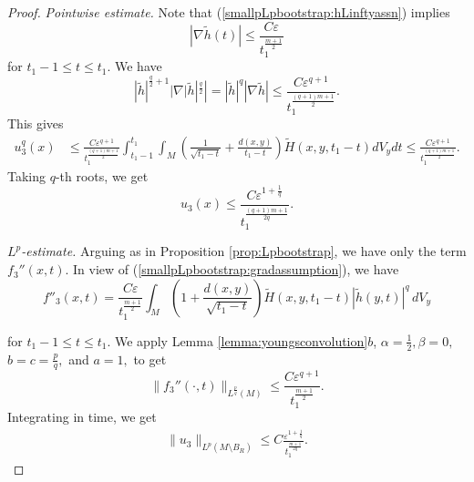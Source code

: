 \documentclass[12pt]{amsart}
\renewcommand{\1}{{\mathbf 1}}
\newcommand{\eps}{{\varepsilon}}
\theoremstyle{others}
\numberwithin{equation}{section}
\begin{document}
\begin{proof}
      \emph{Pointwise estimate.} Note that (\ref{smallpLpbootstrap:hLinftyassn}) implies
     \begin{equation}\label{smallpLpbootstrap:gradassumption}
     |\nabla \tilde{h}(t)| \leq \frac{C \eps}{t_1^{\frac{m + 1}{2}} }
     \end{equation}
    for $t_1 - 1 \leq t \leq t_1.$ We have
    $$|\tilde{h}|^{\frac{q}{2} + 1} |\nabla |\tilde{h}|^{\frac{q}{2}} | = |\tilde{h}|^{q}  | \nabla \tilde{h}| \leq \frac{C \eps^{q + 1} }{t_1^{\frac{(q + 1)m + 1}{2}} }.$$
    This gives
    \begin{equation}\label{smallpu3firstbound}
    \begin{split}
       u^q_3(x) & \leq \frac{C \eps^{q + 1} }{t_1^{\frac{(q + 1)m + 1}{2}} } \int_{t_1 - 1}^{t_1} \!\! \int_M \left( \frac{1}{\sqrt{t_1 - t}} + \frac{d(x,y)}{t_1 - t} \right) \tilde{H}(x,y,t_1 - t) dV_y dt \leq \frac{C \eps^{q + 1} }{t_1^{\frac{(q + 1)m + 1}{2}} }.
       \end{split}
       \end{equation}
Taking $q$-th roots, we get
    \begin{equation}\label{smallpu3xest}
        u_3(x) \leq \frac{C \eps^{1 + \frac{1}{q} } }{t_1^{\frac{(q + 1)m + 1}{2q}} }.
    \end{equation}
    
    \noindent \emph{$L^p$-estimate.} Arguing as in Proposition \ref{prop:Lpbootstrap}, we have only the term $f_3''(x,t).$ In view of (\ref{smallpLpbootstrap:gradassumption}), we have
     $$f''_3(x,t) = \frac{C \eps}{t_1^{\frac{m + 1}{2} } } \int_M \left( 1 + \frac{d(x,y)  }{ \sqrt{t_1 - t}  } \right) \tilde{H}(x,y,t_1 - t) |\tilde{h}(y,t)|^q \, dV_y$$

    for $t_1 -1 \leq t \leq t_1.$ We apply Lemma \ref{lemma:youngsconvolution}$b$, $\alpha = \frac12, \beta = 0,$ $b = c = \frac{p}{q},$ and $a = 1,$ to get
    $$\|f_3''(\cdot, t) \|_{L^{\frac{p}{q}}(M)} \leq \frac{C \eps^{q + 1} }{ t_1^{\frac{m + 1}{2} } }.$$
   Integrating in time, we get
   \begin{equation}\label{smallpu3Lpest}
       \begin{split}
           \| u_3 \|_{L^{p}(M \setminus B_R)} \leq C \frac{\eps^{1 + \frac{1}{q}}}{t_1^{\frac{m + 1}{2q} }}.
       \end{split}
   \end{equation}



\end{proof}
\end{document}
